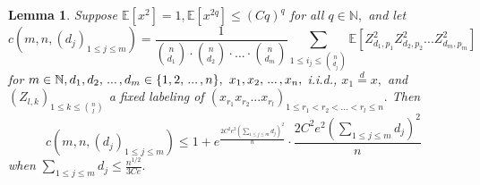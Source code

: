 \documentclass{article}
\newtheorem{lemma}{Lemma}
\numberwithin{equation}{section}
\begin{document}
\begin{lemma}\label{lemmamom}
    Suppose \(\mathbb{E}[x^2]=1,\mathbb{E}[x^{2q}] \leq (Cq)^q\) for all \(q \in \mathbb{N},\) and let 
    \[c(m,n,(d_j)_{1 \leq j \leq m})=\frac{1}{\binom{n}{d_1} \cdot \binom{n}{d_2} \cdot ... \cdot \binom{n}{d_m}}\sum_{1 \leq i_j \leq \binom{n}{d_j}}{\mathbb{E}[Z^2_{d_1,p_1}Z^2_{d_2,p_2}...Z^2_{d_m,p_m}]}\]
    for \(m \in \mathbb{N}, d_1,d_2, \hspace{0.05cm}...\hspace{0.05cm},d_m \in \{1,2,\hspace{0.05cm}...\hspace{0.05cm},n\},\) \(x_1,x_2,\hspace{0.05cm}...\hspace{0.05cm},x_n,\) i.i.d., \(x_1\overset{d}{=} x,\) and \((Z_{l,k})_{1 \leq k \leq \binom{n}{l}}\) a fixed labeling of 
    \((x_{r_1}x_{r_2}...x_{r_l})_{1 \leq r_1<r_2<...<r_l \leq n}.\)
    Then
    \begin{equation}\label{wantedbd}
        c(m,n,(d_j)_{1 \leq j \leq m}) \leq 1+e^{\frac{2C^2e^2(\sum_{1 \leq j \leq m}{d_j})^2}{n}} \cdot \frac{2C^2e^2(\sum_{1 \leq j \leq m}{d_j})^2}{n}
    \end{equation}
    when \(\sum_{1 \leq j \leq m}{d_j} \leq \frac{n^{1/2}}{3Ce}.\)  %
\end{lemma}
\end{document}

